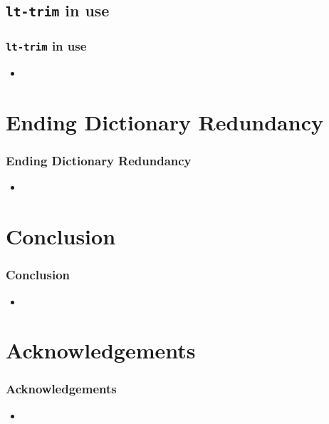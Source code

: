 \documentclass[notes=hide]{beamer}
\newcommand{\tool}[1]{\texttt{#1}}
\begin{document}
\subsection{\tool{lt-trim} in use}
\begin{frame}
  \frametitle{\tool{lt-trim} in use}
  \begin{itemize}
  \item
  \end{itemize}
\end{frame}

\section{Ending Dictionary Redundancy}
\begin{frame}
  \frametitle{Ending Dictionary Redundancy}
  \begin{itemize}
  \item
  \end{itemize}
\end{frame}

\section{Conclusion}
\begin{frame}
  \frametitle{Conclusion}
  \begin{itemize}
  \item
  \end{itemize}
\end{frame}

\section*{Acknowledgements}
\begin{frame}
  \frametitle{Acknowledgements}
  \begin{itemize}
  \item
  \end{itemize}
\end{frame}
\end{document}
